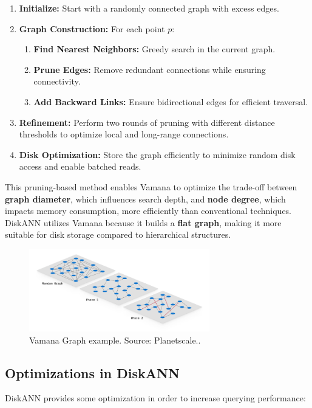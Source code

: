 \begin{enumerate}
    \item \textbf{Initialize:}  
    Start with a randomly connected graph with excess edges.  

    \item \textbf{Graph Construction:}  
    For each point $p$:  
    \begin{enumerate}
        \item \textbf{Find Nearest Neighbors:} Greedy search in the current graph.  
        \item \textbf{Prune Edges:} Remove redundant connections while ensuring connectivity.  
        \item \textbf{Add Backward Links:} Ensure bidirectional edges for efficient traversal.  
    \end{enumerate}

    \item \textbf{Refinement:}  
    Perform two rounds of pruning with different distance thresholds to optimize local and long-range connections.  

    \item \textbf{Disk Optimization:}  
    Store the graph efficiently to minimize random disk access and enable batched reads.  
\end{enumerate}
This pruning-based method enables Vamana to optimize the trade-off between \textbf{graph diameter}, which influences search depth, and \textbf{node degree}, which impacts memory consumption, more efficiently than conventional techniques. DiskANN utilizes Vamana because it builds a \textbf{flat graph}, making it more suitable for disk storage compared to hierarchical structures.
\begin{figure}[h]
    \centering
\includegraphics[width=0.7\textwidth]{IMAGES/immagine_2025-02-27_134619701.png}
    \caption[Vamana]{Vamana Graph example. Source: Planetscale.\footnotemark.}
    \label{fig:Vamana}
\end{figure}
\subsection{Optimizations in DiskANN}
DiskANN provides some optimization in order to increase querying performance:

